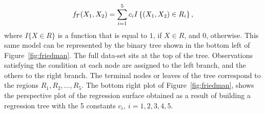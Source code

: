 {\begin{equation}
\mathit{f}_{\mathcal{T}}(X_1,X_2) = \sum_{i=1}^{5} c_i I\left\lbrace(X_1,X_2) \in R_i\right\rbrace,
\label{eq:response}
\end{equation}
where $I\{X\in R\}$ is a function that is equal to $1$, if $X\in R$, and $0$, otherwise.
This same model can be represented by the binary tree shown in the bottom left of Figure~\ref{fig:friedman}. 
The full data-set sits at the top of the tree. 
Observations satisfying the condition at each node are assigned to the left branch, and the others to the right branch. The terminal nodes or leaves of the tree correspond to the regions $R_1,R_2,...,R_5$. 
The bottom right plot of Figure~\ref{fig:friedman}, shows the perspective plot of the regression surface obtained as a result of building a regression tree with the 5 constants $c_i,\ i=1,2,3,4,5$. }

